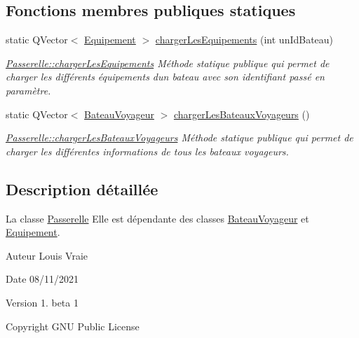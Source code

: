 \subsection*{Fonctions membres publiques statiques}
\begin{DoxyCompactItemize}
\item 
static Q\+Vector$<$ \hyperlink{class_equipement}{Equipement} $>$ \hyperlink{class_passerelle_a7388ba173e23ebf4ceb26d878e9503b3}{charger\+Les\+Equipements} (int un\+Id\+Bateau)
\begin{DoxyCompactList}\small\item\em \hyperlink{class_passerelle_a7388ba173e23ebf4ceb26d878e9503b3}{Passerelle\+::charger\+Les\+Equipements} Méthode statique publique qui permet de charger les différents équipements d\textquotesingle{}un bateau avec son identifiant passé en paramètre. \end{DoxyCompactList}\item 
static Q\+Vector$<$ \hyperlink{class_bateau_voyageur}{Bateau\+Voyageur} $>$ \hyperlink{class_passerelle_a9f8cdd9d52d668bb33a5380324fb9c51}{charger\+Les\+Bateaux\+Voyageurs} ()
\begin{DoxyCompactList}\small\item\em \hyperlink{class_passerelle_a9f8cdd9d52d668bb33a5380324fb9c51}{Passerelle\+::charger\+Les\+Bateaux\+Voyageurs} Méthode statique publique qui permet de charger les différentes informations de tous les bateaux voyageurs. \end{DoxyCompactList}\end{DoxyCompactItemize}


\subsection{Description détaillée}
La classe \hyperlink{class_passerelle}{Passerelle} Elle est dépendante des classes \hyperlink{class_bateau_voyageur}{Bateau\+Voyageur} et \hyperlink{class_equipement}{Equipement}. 

\begin{DoxyAuthor}{Auteur}
Louis Vraie 
\end{DoxyAuthor}
\begin{DoxyDate}{Date}
08/11/2021 
\end{DoxyDate}
\begin{DoxyVersion}{Version}
1. beta 1 
\end{DoxyVersion}
\begin{DoxyCopyright}{Copyright}
G\+NU Public License 
\end{DoxyCopyright}


